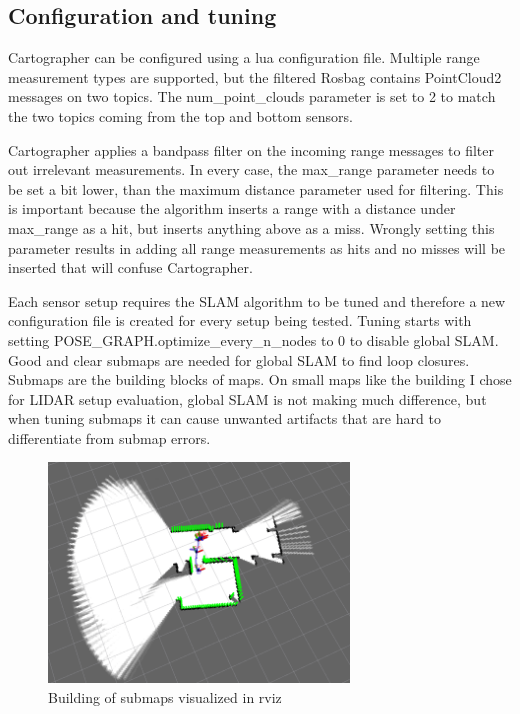 \subsection{Configuration and tuning}
Cartographer can be configured using a lua configuration file. Multiple range measurement types are
supported, but the filtered Rosbag contains PointCloud2 messages on two topics. The num\_point\_clouds
parameter is set to 2 to match the two topics coming from the top and bottom sensors.

Cartographer applies a bandpass filter on the incoming range messages to filter out irrelevant
measurements. In every case, the max\_range parameter needs to be set a bit lower, than the maximum distance
parameter used for filtering. This is important because the algorithm inserts a range with a distance
under max\_range as a hit, but inserts anything above as a miss. Wrongly setting this parameter results
in adding all range measurements as hits and no misses will be inserted that will confuse Cartographer.

Each sensor setup requires the SLAM algorithm to be tuned and therefore a new configuration file is
created for every setup being tested. Tuning starts with setting POSE\_GRAPH.optimize\_every\_n\_nodes to
0 to disable global SLAM. Good and clear submaps are needed for global SLAM to find loop closures.
Submaps are the building blocks of maps. On small maps like the building I chose for LIDAR setup
evaluation, global SLAM is not making much difference, but when tuning submaps it can cause unwanted
artifacts that are hard to differentiate from submap errors.

\begin{figure}[!ht]
    \centering
    \includegraphics[width=80mm, keepaspectratio]{figures/cartographer_submaps.png}
    \caption{Building of submaps visualized in rviz}
    \label{fig:cartographer_submap_building}
\end{figure}

